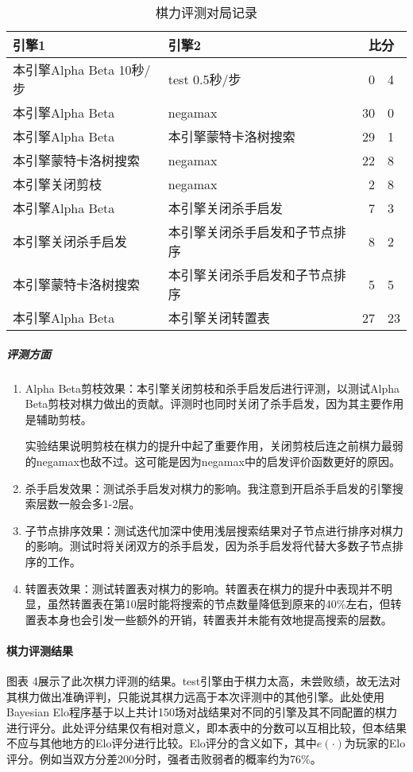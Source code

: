 \documentclass{article}
\begin{document}
\begin{table}
    \begin{tabular}{l l | r @{:} l}
        \textbf{引擎1} & \textbf{引擎2} & \multicolumn{2}{c}{\textbf{比分}} \\
        \hline
        本引擎Alpha Beta 10秒/步 & test 0.5秒/步 & 0 & 4\\
        本引擎Alpha Beta & negamax & 30 & 0\\
        本引擎Alpha Beta & 本引擎蒙特卡洛树搜索 & 29 & 1\\
        本引擎蒙特卡洛树搜索 & negamax & 22 & 8\\
        本引擎关闭剪枝 & negamax & 2 & 8\\
        本引擎Alpha Beta & 本引擎关闭杀手启发 & 7 & 3\\
        本引擎关闭杀手启发 & 本引擎关闭杀手启发和子节点排序 & 8 & 2\\
        本引擎蒙特卡洛树搜索 & 本引擎关闭杀手启发和子节点排序 & 5 & 5\\
        本引擎Alpha Beta & 本引擎关闭转置表 & 27 & 23\\
    \end{tabular}
    \caption{棋力评测对局记录}
\end{table}

\subparagraph{评测方面}
\begin{enumerate}
    \item Alpha Beta剪枝效果：本引擎关闭剪枝和杀手启发后进行评测，以测试Alpha Beta剪枝对棋力做出的贡献。评测时也同时关闭了杀手启发，因为其主要作用是辅助剪枝。
    
    实验结果说明剪枝在棋力的提升中起了重要作用，关闭剪枝后连之前棋力最弱的negamax也敌不过。这可能是因为negamax中的启发评价函数更好的原因。

    \item 杀手启发效果：测试杀手启发对棋力的影响。我注意到开启杀手启发的引擎搜索层数一般会多1-2层。
    \item 子节点排序效果：测试迭代加深中使用浅层搜索结果对子节点进行排序对棋力的影响。测试时将关闭双方的杀手启发，因为杀手启发将代替大多数子节点排序的工作。
    \item 转置表效果：测试转置表对棋力的影响。转置表在棋力的提升中表现并不明显，虽然转置表在第10层时能将搜索的节点数量降低到原来的40\%左右，但转置表本身也会引发一些额外的开销，转置表并未能有效地提高搜索的层数。
\end{enumerate}

\paragraph{棋力评测结果} 图表 4展示了此次棋力评测的结果。test引擎由于棋力太高，未尝败绩，故无法对其棋力做出准确评判，只能说其棋力远高于本次评测中的其他引擎。此处使用Bayesian Elo程序基于以上共计150场对战结果对不同的引擎及其不同配置的棋力进行评分。此处评分结果仅有相对意义，即本表中的分数可以互相比较，但本结果不应与其他地方的Elo评分进行比较。Elo评分的含义如下，其中$e(\cdot)$为玩家的Elo评分。例如当双方分差200分时，强者击败弱者的概率约为76\%。
\end{document}
